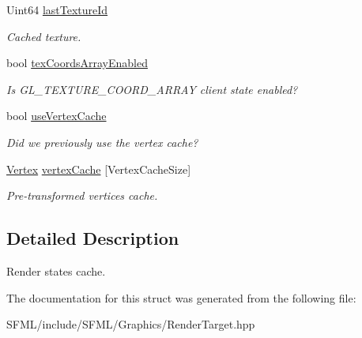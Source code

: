 \begin{DoxyCompactItemize}
Uint64 \mbox{\hyperlink{structsf_1_1_render_target_1_1_states_cache_acdcd0a6ef1410c9cd63f9c4b9115f8d5}{last\+Texture\+Id}}
\begin{DoxyCompactList}\small\item\em Cached texture. \end{DoxyCompactList}\item 
\mbox{\label{structsf_1_1_render_target_1_1_states_cache_a7f83a1139be25ac92a118dfbb26154be}} 
bool \mbox{\hyperlink{structsf_1_1_render_target_1_1_states_cache_a7f83a1139be25ac92a118dfbb26154be}{tex\+Coords\+Array\+Enabled}}
\begin{DoxyCompactList}\small\item\em Is G\+L\+\_\+\+T\+E\+X\+T\+U\+R\+E\+\_\+\+C\+O\+O\+R\+D\+\_\+\+A\+R\+R\+AY client state enabled? \end{DoxyCompactList}\item 
\mbox{\label{structsf_1_1_render_target_1_1_states_cache_ab112b32284a6cadb5d2b2fd68b0a5f03}} 
bool \mbox{\hyperlink{structsf_1_1_render_target_1_1_states_cache_ab112b32284a6cadb5d2b2fd68b0a5f03}{use\+Vertex\+Cache}}
\begin{DoxyCompactList}\small\item\em Did we previously use the vertex cache? \end{DoxyCompactList}\item 
\mbox{\label{structsf_1_1_render_target_1_1_states_cache_a15af73593020c616d4cf0a4cfccd2ab4}} 
\mbox{\hyperlink{classsf_1_1_vertex}{Vertex}} \mbox{\hyperlink{structsf_1_1_render_target_1_1_states_cache_a15af73593020c616d4cf0a4cfccd2ab4}{vertex\+Cache}} \mbox{[}Vertex\+Cache\+Size\mbox{]}
\begin{DoxyCompactList}\small\item\em Pre-\/transformed vertices cache. \end{DoxyCompactList}\end{DoxyCompactItemize}


\subsection{Detailed Description}
Render states cache. 

\begin{DoxyVerb}\end{DoxyVerb}
 

The documentation for this struct was generated from the following file\+:\begin{DoxyCompactItemize}
\item 
S\+F\+M\+L/include/\+S\+F\+M\+L/\+Graphics/Render\+Target.\+hpp\end{DoxyCompactItemize}
